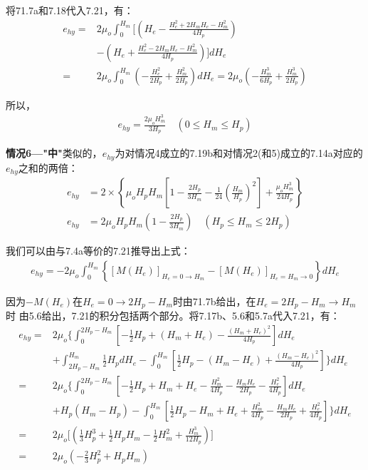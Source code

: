 将71.7a和7.18代入7.21，有：
\begin{align*}%
e_{hy}=&2\mu_o\int_{0}^{H_m}\Big[\left(H_e-\frac{H_{e}^{2}+2H_mH_e-H_{m}^{2}}{4H_p}\right) \\
&-\left(H_e+\frac{H_{e}^{2}-2H_mH_e-H_{m}^{2}}{4H_p}\right)\Big]dH_e \\
=&2\mu_o\int_{0}^{H_m}\left(-\frac{H_{e}^{2}}{2H_p}+\frac{H_{m}^{2}}{2H_p}\right)dH_e=2\mu_o\left(-\frac{H_{m}^{3}}{6H_p}+\frac{H_{m}^{3}}{2H_p}\right)
\end{align*}

所以，
\begin{align*}
e_{hy}=\frac{2\mu_oH_{m}^{3}}{3H_p} \quad (0\leq H_m\leq H_p) \tag{7.20}
\end{align*}

\textbf{情况6---"中"}\quad 类似的，$e_{hy}$为对情况4成立的7.19b和对情况2(和5)成立的7.14a对应的$e_{hy}$之和的两倍：
\begin{align*}%
e_{hy}&=2\times\left\{\mu_oH_pH_m\left[1-\frac{2H_p}{3H_m}-\frac{1}{24}\left(\frac{H_m}{H_p}\right)^2\right]+\frac{\mu_oH_{m}^{3}}{24H_p}\right\}\\
e_{hy}&=2\mu_oH_pH_m\left(1-\frac{2H_p}{3H_m}\right)\quad (H_p\leq H_m\leq 2H_p) \tag{7.20b}
\end{align*}

我们可以由与7.4a等价的7.21推导出上式：
\begin{align*}%
e_{hy}=-2\mu_o\int_{0}^{H_m}\left\{[M(H_e)]_{H_e=0\rightarrow H_m}-[M(H_e)]_{H_e=H_m\rightarrow 0}\right\}dH_e \tag{7.21}
\end{align*}

因为$-M(H_e)$在$H_e=0\rightarrow 2H_p-H_m$时由71.7b给出，在$H_e=2H_p-H_m\rightarrow H_m$时
由5.6给出，7.21的积分包括两个部分。将7.17b、5.6和5.7a代入7.21，有：
\begin{align*}%
e_{hy}=&2\mu_o\{\int_{0}^{2H_p-H_m}\left[-\frac{1}{2}H_p+(H_m+H_e)-\frac{(H_m+H_e)^2}{4H_p}\right]dH_e \\
&+\int_{2H_p-H_m}^{H_m}\frac{1}{2}H_pdH_e-\int_{0}^{H_m}\left[\frac{1}{2}H_p-(H_m-H_e)+\frac{(H_m-H_e)^2}{4H_p}\right]\}dH_e\\
=&2\mu_o\Big\{\int_{0}^{2H_p-H_m}\left[-\frac{1}{2}H_p+H_m+H_e-\frac{H_{m}^{2}}{4H_p}-\frac{H_mH_e}{2H_p}-\frac{H_{e}^{2}}{4H_p}\right]dH_e \\
&+H_p(H_m-H_p)-\int_{0}^{H_m}\left[\frac{1}{2}H_p-H_m+H_e+\frac{H_{m}^{2}}{4H_p}-\frac{H_mH_e}{2H_p}+\frac{H_{e}^{2}}{4H_p}\right]\Big\}dH_e \\
=&2\mu_o\Big[\left(\frac{1}{3}H_{p}^{3}+\frac{1}{2}H_pH_m-\frac{1}{2}H_{m}^{2}+\frac{H_{m}^{3}}{12H_p}\right)\Big] \\
=&2\mu_o\left(-\frac{2}{3}H_{p}^{2}+H_pH_m\right) 
\end{align*}

